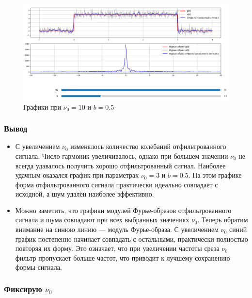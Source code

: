 \documentclass[a4paper,12pt]{article}
\begin{document}
\begin{figure}[H]  
    \centering
    \includegraphics[width=1\textwidth]{../images/1.1_0.5_10.png}
    \caption{Графики при \(\nu_0 = 10\) и \(b = 0.5\)}  
    \label{fig:my_image}  
\end{figure}

\subsubsection{Вывод}

\begin{itemize}
    \item С увеличением \(\nu_0\) изменялось количество колебаний отфильтрованного сигнала. 
    Число гармоник увеличивалось, однако при большем значении \(\nu_0\) не всегда удавалось получить
    хорошо отфильтрованный сигнал. Наиболее удачным оказался график при параметрах \(\nu_0 = 3\) и \(b = 0.5\). 
    На этом графике форма отфильтрованного сигнала практически идеально совпадает с исходной, 
    а шум удалён наиболее эффективно.

    \item Можно заметить, что графики модулей Фурье-образов отфильтрованного сигнала и шума совпадают 
    при всех выбранных значениях \(\nu_0\). Теперь обратим внимание на синюю линию — модуль Фурье-образа. 
    С увеличением \(\nu_0\) синий график постепенно начинает совпадать с остальными, практически 
    полностью повторяя их форму. Это означает, что при увеличении частоты среза \(\nu_0\) фильтр 
    пропускает больше частот, что приводит к лучшему сохранению формы сигнала.


\end{itemize}

\subsubsection{Фиксирую \(\nu_0\)}
\end{document}
